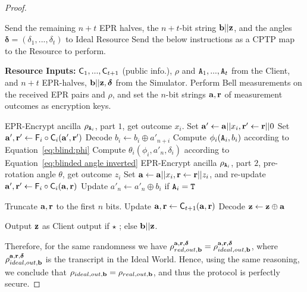 \begin{proof}
\begin{simulatorr}
\begin{algorithmic}[1]
        \State Send the remaining $n+t$ EPR halves, the $n+t$-bit string $\mathbf b||\mathbf z$, and the angles $\boldsymbol\delta=(\delta_1, ..., \delta_t)$ to Ideal Resource
        \State Send the below instructions as a CPTP map to the Resource to perform.
        \EndProcedure

        \State \textbf{Resource Inputs:} $\mathsf{C}_1, ..., \mathsf{C}_{t+1}$ (public info.), $\rho$ and $\mathtt{A}_1, ..., \mathtt{A}_t$ from the Client, and $n+t$ EPR-halves, $\mathbf b||\mathbf z, \boldsymbol{\delta}$ from the Simulator.
        \State Perform Bell measurements on the received EPR pairs and $\rho$, and set the $n$-bit strings $\mathbf a, \mathbf r$ of measurement outcomes as encryption keys.
        \EndProcedure

        \State EPR-Encrypt ancilla $\rho_{\mathtt{A}_i}$, part $1$, get outcome $x_i$.
        \State Set $\mathbf a'\gets \mathbf a||x_i, \mathbf r'\gets \mathbf r||0$
        \State Set $\mathbf a', \mathbf r'\gets \mathsf{F}_i\circ\mathsf{C}_{i}(\mathbf a', \mathbf r')$
        \State Decode $b_i \gets b_i \oplus a'_{n+i}$
        \State Compute $\phi_i(\mathtt{A}_i, b_i)$ according to Equation~\ref{eq:blind:phi}
        \State Compute $\theta_i(\phi_i, a'_n, \delta_i)$ according to Equation~\ref{eq:blinded angle inverted}
        \State EPR-Encrypt ancilla $\rho_{\mathtt{A}_i}$, part $2$, pre-rotation angle $\theta$, get outcome $z_i$
        \State Set $\mathbf a\gets\mathbf a||x_i, \mathbf r\gets \mathbf r||z_i$, and re-update $\mathbf a', \mathbf r'\gets \mathsf{F}_i\circ \mathsf{C}_i(\mathbf a, \mathbf r)$
        \State Update $a'_n \gets a'_n\oplus b_i$ if $\mathtt{A}_i=\mathtt{T}$
        \EndFor
        \EndProcedure

        \State Truncate $\mathbf a, \mathbf r$ to the first $n$ bits.
        \State Update $\mathbf a, \mathbf r\gets \mathsf{C}_{t+1}(\mathbf a, \mathbf r)$
        \State Decode $\mathbf z\gets \mathbf z\oplus \mathbf a$
        \EndProcedure

        \State Output $\mathbf z$ as Client output if $\star$ ; else $\mathbf b||\mathbf z$.
    \end{algorithmic}
    \end{simulatorr}

    Therefore, for the same randomness we have $\rho_{red, out, \mathbf b}^{\mathbf a, \mathbf r, \boldsymbol{\delta}} = \rho_{ideal, out, \mathbf b}^{\mathbf a, \mathbf r, \boldsymbol{\delta}}$, where $\rho_{ideal, out, \mathbf b}^{\mathbf a, \mathbf r, \boldsymbol{\delta}}$ is the transcript in the Ideal World.
    Hence, using the same reasoning, we conclude that $\rho_{ideal, out, \mathbf b} = \rho_{real, out, \mathbf b}$, and thus the protocol is perfectly secure.

\end{proof}
